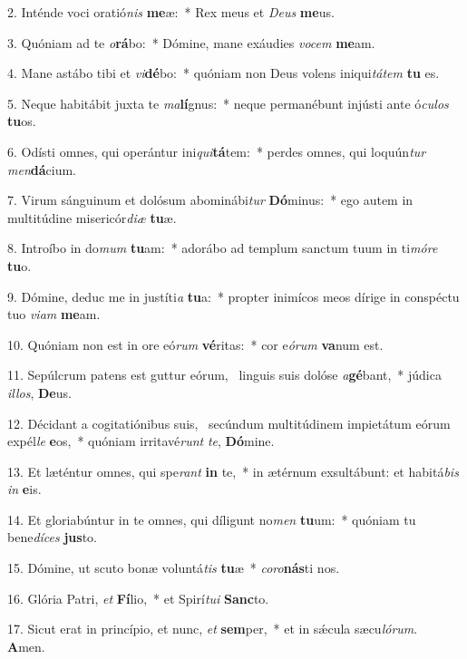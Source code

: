 2. Inténde voci oratió\textit{nis} \textbf{me}æ:~*  Rex meus et \textit{De}\textit{us} \textbf{me}us.\

3. Quóniam ad te \textit{o}\textbf{rá}bo:~*  Dómine, mane exáudies \textit{vo}\textit{cem} \textbf{me}am.\

4. Mane astábo tibi et \textit{vi}\textbf{dé}bo:~*  quóniam non Deus volens iniqui\textit{tá}\textit{tem} \textbf{tu} es.\

5. Neque habitábit juxta te \textit{ma}\textbf{lí}gnus:~*  neque permanébunt injústi ante ó\textit{cu}\textit{los} \textbf{tu}os.\

6. Odísti omnes, qui operántur ini\textit{qui}\textbf{tá}tem:~*  perdes omnes, qui loquún\textit{tur} \textit{men}\textbf{dá}cium.\

7. Virum sánguinum et dolósum abominábi\textit{tur} \textbf{Dó}minus:~*  ego autem in multitúdine misericór\textit{di}\textit{æ} \textbf{tu}æ.\

8. Introíbo in do\textit{mum} \textbf{tu}am:~*  adorábo ad templum sanctum tuum in ti\textit{mó}\textit{re} \textbf{tu}o.\

9. Dómine, deduc me in justíti\textit{a} \textbf{tu}a:~*  propter inimícos meos dírige in conspéctu tuo \textit{vi}\textit{am} \textbf{me}am.\

10. Quóniam non est in ore eó\textit{rum} \textbf{vé}ritas:~*  cor e\textit{ó}\textit{rum} \textbf{va}num est.\

11. Sepúlcrum patens est guttur eórum, \dag\  linguis suis dolóse \textit{a}\textbf{gé}bant,~*  júdica \textit{il}\textit{los}, \textbf{De}us.\

12. Décidant a cogitatiónibus suis, \dag\  secúndum multitúdinem impietátum eórum expél\textit{le} \textbf{e}os,~*  quóniam irritavé\textit{runt} \textit{te}, \textbf{Dó}mine.\

13. Et læténtur omnes, qui spe\textit{rant} \textbf{in} te,~*  in ætérnum exsultábunt: et habitá\textit{bis} \textit{in} \textbf{e}is.\

14. Et gloriabúntur in te omnes, qui díligunt no\textit{men} \textbf{tu}um:~*  quóniam tu bene\textit{dí}\textit{ces} \textbf{jus}to.\

15. Dómine, ut scuto bonæ voluntá\textit{tis} \textbf{tu}æ~*  \textit{co}\textit{ro}\textbf{nás}ti nos.\

16. Glória Patri, \textit{et} \textbf{Fí}lio,~*  et Spirí\textit{tu}\textit{i} \textbf{Sanc}to.\

17. Sicut erat in princípio, et nunc, \textit{et} \textbf{sem}per,~*  et in sǽcula sæcu\textit{ló}\textit{rum}. \textbf{A}men.\

